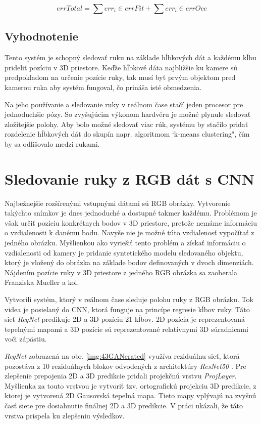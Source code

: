 \begin{equation}\label{eqn:errTotal}
    errTotal=\sum{err_i \in errFit} + \sum{err_i \in errOcc}
\end{equation}

\subsection{Vyhodnotenie}
Tento systém je schopný sledovať ruku na základe hĺbkových dát a každému kĺbu prideliť pozíciu v 3D priestore. Keďže hĺbkové dáta najbližšie ku kamere sú predpokladom na určenie pozície ruky, tak musí byť prvým objektom pred kamerou ruka aby systém fungoval, čo prináša isté obmedzenia.

Na jeho používanie a sledovanie ruky v reálnom čase stačí jeden procesor pre jednoduchšie pózy. So zvyšujúcim výkonom hardvéru je možné plynule sledovať zložitejšie polohy. Aby bolo možné sledovať viac rúk, systému by stačilo pridať rozdelenie hĺbkových dát do skupín napr. algoritmom `k-means clustering", čím by sa odlišovalo medzi rukami.

\section{Sledovanie ruky z RGB dát s CNN}\label{chpt:GANerated}
Najbežnejšie rozšírenými vstupnými dátami sú RGB obrázky. Vytvorenie takýchto snímkov je dnes jednoduché a dostupné takmer každému. Problémom je však určiť pozíciu konkrétnych bodov v 3D priestore, pretože nemáme informáciu o vzdialenosti k danému bodu. Navyše nie je možné túto vzdialenosť vypočítať z jedného obrázku. Myšlienkou ako vyriešiť tento problém a získať informáciu o vzdialenosti od kamery je pridanie syntetického modelu sledovaného objektu, ktorý je vložený do obrázka na základe bodov definovaných v dvoch dimenziách. Nájdením pozície ruky v 3D priestore z jedného RGB obrázka sa zaoberala Franziska Mueller a kol. \cite{GANeratedHands_CVPR2018}

Vytvorili systém, ktorý v reálnom čase sleduje polohu ruky z RGB obrázku. Tok videa je posielaný do CNN, ktorá funguje na princípe regresie kĺbov ruky. Táto sieť {\it RegNet} predikuje 2D a 3D pozíciu 21 kĺbov. 2D pozícia je reprezentovaná tepelnými mapami a 3D pozície sú reprezentované relatívnymi 3D súradnicami voči zápästiu.

{\it RegNet} zobrazená na obr. \ref{img:43GANerated} využíva reziduálnu sieť, ktorá pozostáva z 10 reziduálnych blokov odvodených z architektúry {\it ResNet50} \cite{DBLP:journals/corr/HeZRS15}. Pre zlepšenie prepojenia 2D a 3D predikcie pridali projekčnú vrstvu {\it ProjLayer}. Myšlienka za touto vrstvou je vytvoriť tzv. ortografickú projekciu 3D predikcie, z ktorej je vytvorená 2D Gausovská tepelná mapa. Tieto mapy vplývajú na zvyšnú časť siete pre dosiahnutie finálnej 2D a 3D predikcie. V práci ukázali, že táto vrstva prispela ku zlepšeniu výsledkov.

